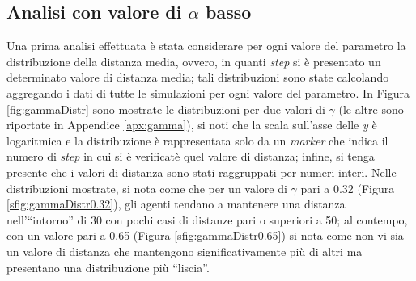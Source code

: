 \subsection{Analisi con valore di $\alpha$ basso}
\label{subsec:gammaalow}
Una prima analisi effettuata è stata considerare per ogni valore del parametro la distribuzione della distanza media, ovvero, in quanti \textit{step} si è presentato un determinato valore di distanza media; tali distribuzioni sono state calcolando aggregando i dati di tutte le simulazioni per ogni valore del parametro.
In Figura \ref{fig:gammaDistr} sono mostrate le distribuzioni per due valori di $\gamma$ (le altre sono riportate in Appendice \ref{apx:gamma}), si noti che la scala sull'asse delle \textit{y} è logaritmica e la distribuzione è rappresentata solo da un \textit{marker} che indica il numero di \textit{step} in cui si è verificatè quel valore di distanza; infine, si tenga presente che i valori di distanza sono stati raggruppati per numeri interi.
Nelle distribuzioni mostrate, si nota come che per un valore di $\gamma$ pari a 0.32 (Figura \ref{sfig:gammaDistr0.32}), gli agenti tendano a mantenere una distanza nell'“intorno” di 30 con pochi casi di distanze pari o superiori a 50; al contempo, con un valore pari a 0.65 (Figura \ref{sfig:gammaDistr0.65}) si nota come non vi sia un valore di distanza che mantengono significativamente più di altri ma presentano una distribuzione più “liscia”.\\
